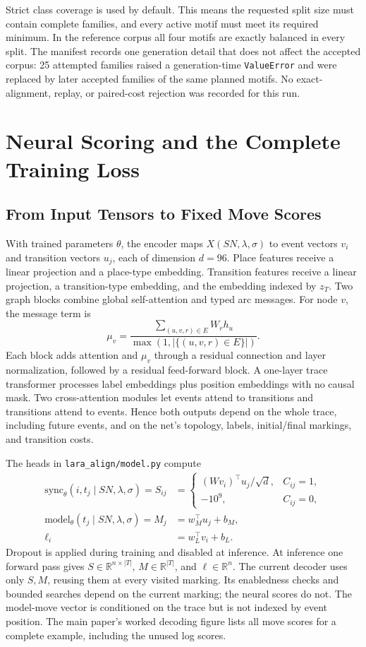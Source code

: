 \documentclass[11pt]{article}
\begin{document}
Strict class coverage is used by default. This means the requested split size
must contain complete families, and every active motif must meet its required
minimum. In the reference corpus all four motifs are exactly balanced in every
split. The manifest records one generation detail that does not affect the
accepted corpus: 25 attempted families raised a generation-time
\texttt{ValueError} and were replaced by later accepted families of the same
planned motifs. No exact-alignment, replay, or paired-cost rejection was
recorded for this run.


\FloatBarrier
\section{Neural Scoring and the Complete Training Loss}
\label{app:loss}

\subsection{From Input Tensors to Fixed Move Scores}

With trained parameters $\theta$, the encoder maps $X(SN,\lambda,\sigma)$
to event vectors $v_i$ and transition vectors $u_j$, each of dimension $d=96$.
Place features receive a linear projection and a place-type embedding.
Transition features receive a linear projection, a transition-type embedding,
and the embedding indexed by $z_T$. Two graph blocks combine global
self-attention and typed arc messages. For node $v$, the message term is
\[
 \mu_v=\frac{\sum_{(u,v,r)\in E}W_r h_u}
 {\max(1,|\{(u,v,r)\in E\}|)}.
\]
Each block adds attention and $\mu_v$ through a residual connection and layer
normalization, followed by a residual feed-forward block. A one-layer trace
transformer processes label embeddings plus position embeddings with no causal
mask. Two cross-attention modules let events attend to transitions and
transitions attend to events. Hence both outputs depend on the whole trace,
including future events, and on the net's topology, labels, initial/final
markings, and transition costs.

The heads in \texttt{lara\_align/model.py} compute
\[
\begin{split}
 \mathrm{sync}_\theta(i,t_j\mid SN,\lambda,\sigma)=S_{ij}
 &=\begin{cases}(Wv_i)^\top u_j/\sqrt d,&C_{ij}=1,\\-10^9,&C_{ij}=0,\end{cases}\\
 \mathrm{model}_\theta(t_j\mid SN,\lambda,\sigma)=M_j&=w_M^\top u_j+b_M,\\
 \ell_i&=w_L^\top v_i+b_L.
\end{split}
\]
Dropout is applied during training and disabled at inference. At inference one
forward pass gives $S\in\mathbb{R}^{n\times|T|}$,
$M\in\mathbb{R}^{|T|}$, and $\ell\in\mathbb{R}^n$. The current decoder uses
only $S,M$, reusing them at every visited marking. Its enabledness checks and
bounded searches depend on the current marking; the neural scores do not.
The model-move vector is conditioned on the trace but is not indexed by event
position. The main paper's worked decoding figure lists all move scores for a
complete example, including the unused log scores.
\end{document}

